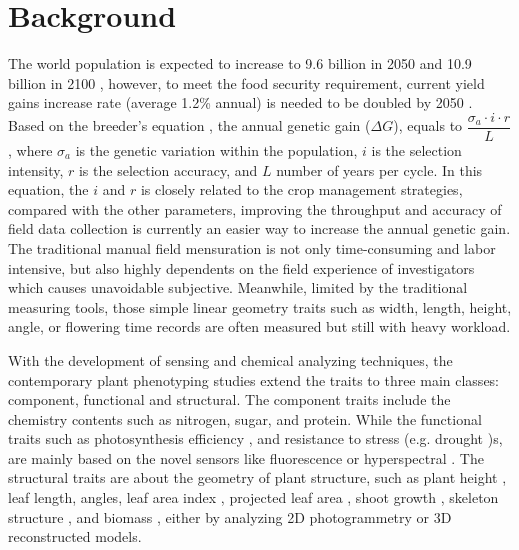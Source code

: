 \documentclass{configs/bmcart}
\begin{document}
\section*{Background}
The world population is expected to increase to 9.6 billion in 2050 and 10.9 billion in 2100 \cite{gerland_world_2014}, however, to meet the food security requirement, current yield gains increase rate (average 1.2\% annual) is needed to be doubled by 2050 \cite{ray_yield_2013}. Based on the breeder's equation \cite{eberhart_factors_1970, cobb_enhancing_2019}, the annual genetic gain ($\Delta G$), equals to $\dfrac{\sigma_{a} \cdot i \cdot r}{L}$, where $\sigma_a$ is the genetic variation within the population, $i$ is the selection intensity, $r$ is the selection accuracy, and $L$ number of years per cycle. In this equation, the $i$ and $r$ is closely related to the crop management strategies, compared with the other parameters, improving the throughput and accuracy of field data collection is currently an easier way to increase the annual genetic gain. The traditional manual field mensuration is not only time-consuming and labor intensive, but also highly dependents on the field experience of investigators which causes unavoidable subjective. Meanwhile, limited by the traditional measuring tools, those simple linear geometry traits such as width, length, height, angle, or flowering time records are often measured but still with heavy workload.

With the development of sensing and chemical analyzing techniques, the contemporary plant phenotyping studies extend the traits to three main classes: component, functional and structural. The component traits include the chemistry contents such as nitrogen, sugar, and protein. While the functional traits such as photosynthesis efficiency \cite{song_optimal_2013}, and resistance to stress (e.g. drought \cite{araus_phenotyping_2012, xiang_robotic_2020})s, are mainly based on the novel sensors like fluorescence \cite{krause_chlorophyll_1991} or hyperspectral \cite{yendrek_high-throughput_2017}. The structural traits are about the geometry of plant structure, such as plant height \cite{ten_harkel_biomass_2019}, leaf length, angles, leaf area index \cite{zermas_3d_2020}, projected leaf area \cite{guo_easypcc:_2017}, shoot growth \cite{li_measuring_2020}, skeleton structure \cite{wu_accurate_2019}, and biomass \cite{ten_harkel_biomass_2019, jin_non-destructive_2020}, either by analyzing 2D photogrammetry or 3D reconstructed models.
\end{document}
